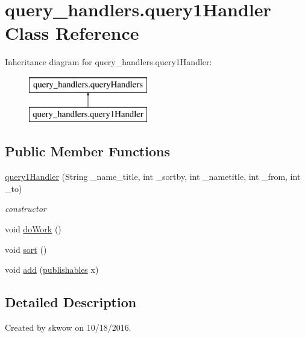 \hypertarget{classquery__handlers_1_1query1_handler}{}\section{query\+\_\+handlers.\+query1\+Handler Class Reference}
\label{classquery__handlers_1_1query1_handler}
Inheritance diagram for query\+\_\+handlers.\+query1\+Handler\+:\begin{figure}[H]
\begin{center}
\leavevmode
\includegraphics[height=2.000000cm]{classquery__handlers_1_1query1_handler}
\end{center}
\end{figure}
\subsection*{Public Member Functions}
\begin{DoxyCompactItemize}
\item 
\hyperlink{classquery__handlers_1_1query1_handler_a6fe01c044940a164a6c56149fd031131}{query1\+Handler} (String \+\_\+name\+\_\+title, int \+\_\+sortby, int \+\_\+nametitle, int \+\_\+from, int \+\_\+to)
\begin{DoxyCompactList}\small\item\em constructor \end{DoxyCompactList}\item 
void \hyperlink{classquery__handlers_1_1query1_handler_a6e9b752a4ad27626e66dd07bd45661df}{do\+Work} ()
\item 
void \hyperlink{classquery__handlers_1_1query1_handler_ad31be63c673088813821cb1150c8506e}{sort} ()
\item 
void \hyperlink{classquery__handlers_1_1query1_handler_a139b0b15be5b2a7ac0b58a70906fb2a0}{add} (\hyperlink{class_data_1_1publishables}{publishables} x)
\end{DoxyCompactItemize}


\subsection{Detailed Description}
Created by skwow on 10/18/2016. 

